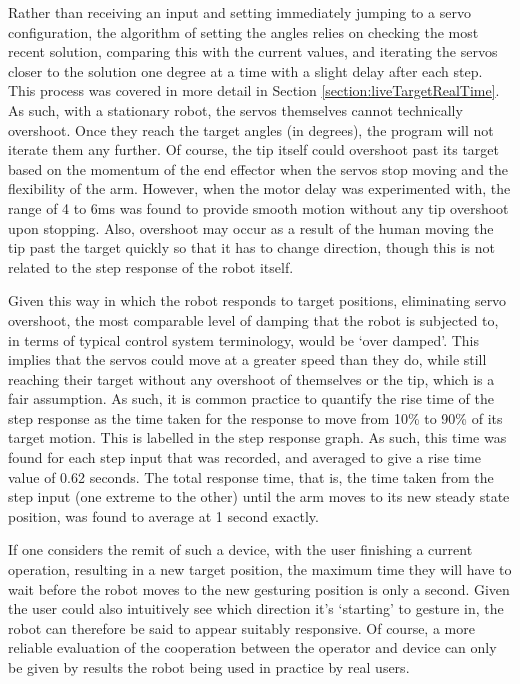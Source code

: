 \documentclass[11pt]{article}
\begin{document}
Rather than receiving an input and setting immediately jumping to a servo configuration, the algorithm of setting the angles relies on checking the most recent solution, comparing this with the current values, and iterating the servos closer to the solution one degree at a time with a slight delay after each step. This process was covered in more detail in Section \ref{section:liveTargetRealTime}. As such, with a stationary robot, the servos themselves cannot technically overshoot. Once they reach the target angles (in degrees), the program will not iterate them any further. Of course, the tip itself could overshoot past its target based on the momentum of the end effector when the servos stop moving and the flexibility of the arm. However, when the motor delay was experimented with, the range of 4 to 6ms was found to provide smooth motion without any tip overshoot upon stopping. Also, overshoot may occur as a result of the human moving the tip past the target quickly so that it has to change direction, though this is not related to the step response of the robot itself. 

Given this way in which the robot responds to target positions, eliminating servo overshoot, the most comparable level of damping that the robot is subjected to, in terms of typical control system terminology, would be `over damped'. This implies that the servos could move at a greater speed than they do, while still reaching their target without any overshoot of themselves or the tip, which is a fair assumption. As such, it is common practice to quantify the rise time of the step response as the time taken for the response to move from 10\% to 90\% of its target motion. This is labelled in the step response graph. As such, this time was found for each step input that was recorded, and averaged to give a rise time value of 0.62 seconds. The total response time, that is, the time taken from the step input (one extreme to the other) until the arm moves to its new steady state position, was found to average at 1 second exactly. 

If one considers the remit of such a device, with the user finishing a current operation, resulting in a new target position, the maximum time they will have to wait before the robot moves to the new gesturing position is only a second. Given the user could also intuitively see which direction it's `starting' to gesture in, the robot can therefore be said to appear suitably responsive. Of course, a more reliable evaluation of the cooperation between the operator and device can only be given by results the robot being used in practice by real users.
\end{document}
